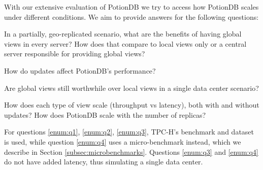 \documentclass[sigconf, nonacm]{acmart}
\begin{document}
With our extensive evaluation of PotionDB we try to access how PotionDB scales under different conditions.
We aim to provide answers for the following questions:
\begin{enumerate*}[label=(\roman*)]
	\item  \label{enum:q1} In a partially, geo-replicated scenario, what are the benefits of having global views in every server?
	How does that compare to local views only or a central server responsible for providing global views?
	\item \label{enum:q2} How do updates affect PotionDB's performance?
	\item \label{enum:q3} Are global views still worthwhile over local views in a single data center scenario?
	\item \label{enum:q4} How does each type of view scale (throughput vs latency), both with and without updates? How does PotionDB scale with the number of replicas?
\end{enumerate*}


For questions \ref{enum:q1}, \ref{enum:q2}, \ref{enum:q3}, TPC-H's benchmark and dataset is used, while question \ref{enum:q4} uses a micro-benchmark instead, which we describe in Section \ref{subsec:microbenchmarks}.
Questions \ref{enum:q3} and \ref{enum:q4} do not have added latency, thus simulating a single data center.
\end{document}
